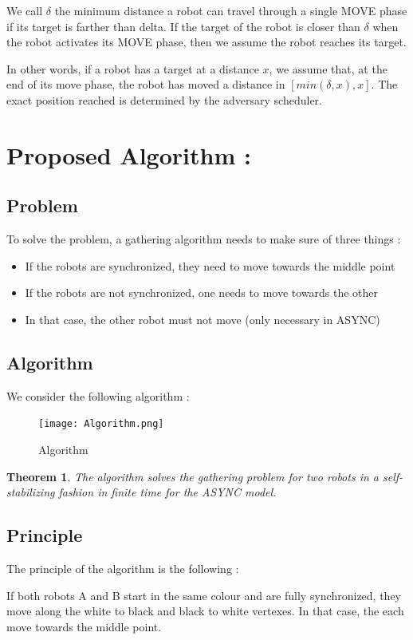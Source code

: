 \documentclass[11pt]{article}
\newtheorem{Theorem}{Theorem}
\begin{document}
We call $\delta$ the minimum distance a robot can travel through a single MOVE phase if its target is farther than delta. If the target of the robot is closer than $\delta$ when the robot activates its MOVE phase, then we assume the robot reaches its target.

In other words, if a robot has a target at a distance $x$, we assume that, at the end of its move phase, the robot has moved a distance in $[min(\delta,x),x]$. The exact position reached is determined by the adversary scheduler.
\section{Proposed Algorithm :}
\subsection{Problem}
To solve the problem, a gathering algorithm needs to make sure of three things : 

\begin{itemize}
\item If the robots are synchronized, they need to move towards the middle point
\item If the robots are not synchronized, one needs to move towards the other
\item In that case, the other robot must not move (only necessary in ASYNC)
\end{itemize}
\subsection{Algorithm}
We consider the following algorithm :

\begin{figure}[H]
	\centering
	\texttt{[image: Algorithm.png]}
	\caption{Algorithm}
\end{figure}

\begin{Theorem}
The algorithm solves the gathering problem for two robots in a self-stabilizing fashion in finite time for the ASYNC model.
\end{Theorem}

\subsection{Principle}

The principle of the algorithm is the following :

If both robots A and B start in the same colour and are fully synchronized, they move along the white to black and black to white vertexes. In that case, the each move towards the middle point.
\end{document}

